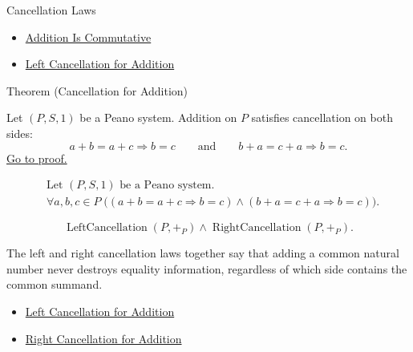 \begin{topicbox}{Cancellation Laws}
\begin{dependencies}
\begin{itemize}
  \item \hyperref[thm:addition-commutative]{Addition Is Commutative}
  \item \hyperref[thm:addition-left-cancellation]{Left Cancellation for Addition}
\end{itemize}
\end{dependencies}

\begin{theorembox}{Theorem (Cancellation for Addition)}
\begin{theorem}
\label{thm:addition-cancellation}
Let $(P,S,1)$ be a Peano system. Addition on $P$ satisfies cancellation on
both sides:
\[
a+b=a+c\Longrightarrow b=c
\qquad\text{and}\qquad
b+a=c+a\Longrightarrow b=c.
\]
\hyperref[prf:addition-cancellation]{Go to proof.}
\end{theorem}
\end{theorembox}

\begin{remark*}
\[
\begin{aligned}
&\text{Let } (P,S,1) \text{ be a Peano system.}\\
&\forall a,b,c \in P\;
\bigl((a+b=a+c \Longrightarrow b=c) \land
(b+a=c+a \Longrightarrow b=c)\bigr).
\end{aligned}
\]
\end{remark*}

\begin{remark*}
\[
\operatorname{LeftCancellation}(P,+_P)
\land
\operatorname{RightCancellation}(P,+_P).
\]
\end{remark*}

\begin{remark*}[Interpretation]
The left and right cancellation laws together say that adding a common natural
number never destroys equality information, regardless of which side contains
the common summand.
\end{remark*}

\begin{dependencies}
\begin{itemize}
  \item \hyperref[thm:addition-left-cancellation]{Left Cancellation for Addition}
  \item \hyperref[thm:addition-right-cancellation]{Right Cancellation for Addition}
\end{itemize}
\end{dependencies}
\end{topicbox}

